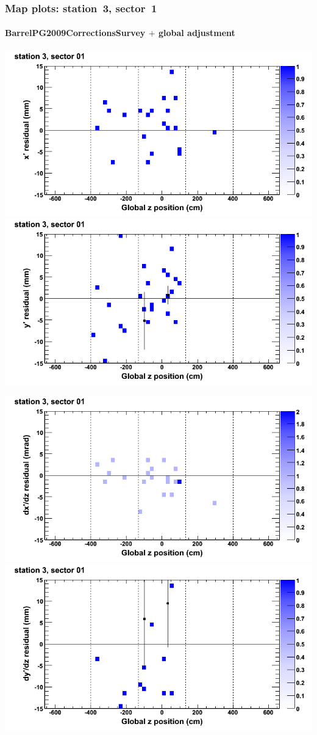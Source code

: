 \documentclass[compress]{beamer}
\begin{document}
\begin{frame}
\frametitle{Map plots: station~3, sector~1}
\framesubtitle{BarrelPG2009CorrectionsSurvey $+$ global adjustment}
\includegraphics[width=0.5\linewidth]{mapplots_re01/DTvsz_st3sec01_x.png}
\includegraphics[width=0.5\linewidth]{mapplots_re01/DTvsz_st3sec01_y.png}

\includegraphics[width=0.5\linewidth]{mapplots_re01/DTvsz_st3sec01_dxdz.png}
\includegraphics[width=0.5\linewidth]{mapplots_re01/DTvsz_st3sec01_dydz.png}
\end{frame}
\end{document}
